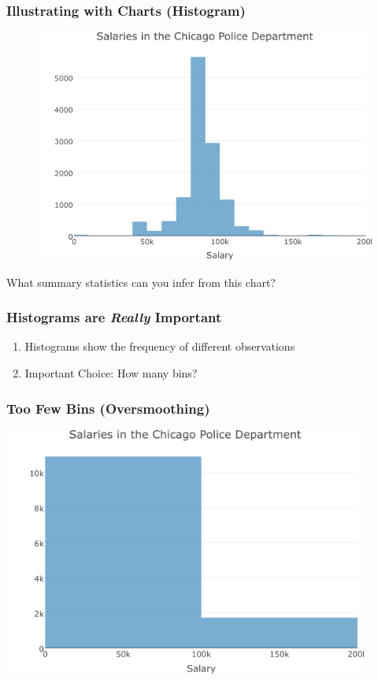 \documentclass{beamer}
\begin{document}
\begin{frame}
\frametitle{Illustrating with Charts (Histogram)}
	\begin{figure}
		\includegraphics[scale = 0.45]{./images/chicagoHistogram.png}
	\end{figure}
    What summary statistics can you infer from this chart?
\end{frame}

\begin{frame}
\frametitle{Histograms are \emph{Really} Important}
	\begin{enumerate}
		\item Histograms show the frequency of different observations
		\item \alert{Important Choice:} How many bins?
	\end{enumerate}
\end{frame}

\begin{frame}
\frametitle{Too Few Bins (Oversmoothing)}
	\centering
	\includegraphics[width = 0.9\textwidth]{./images/histogramFew.png}
\end{frame}
\end{document}
